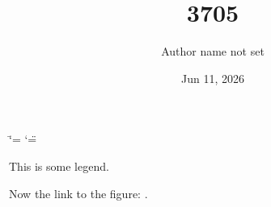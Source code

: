 \documentclass[letterpaper,10pt,english]{sphinxmanual}
\title{3705}
\date{Jun 11, 2026}
\author{Author name not set}
\begin{document}
\ifdefined\shorthandoff
  \ifnum\catcode`\=\string=\active\shorthandoff{=}\fi
  \ifnum\catcode`\"=\active{}\fi
\fi

\pagestyle{empty}
\sphinxmaketitle
\pagestyle{plain}
\sphinxtableofcontents
\pagestyle{normal}
\label{\detokenize{index::doc}}


\begin{sphinxtopic}

\begin{center}
\noindent{}
\label{\detokenize{index:afigure}}
\begin{sphinxlegend}
\sphinxAtStartPar
This is some legend.
\end{sphinxlegend}
\end{center}
\end{sphinxtopic}

\sphinxAtStartPar
Now the link to the figure: {\hyperref[\detokenize{index:afigure}]{}}.



\renewcommand{\indexname}{Index}
\printindex
\end{document}
